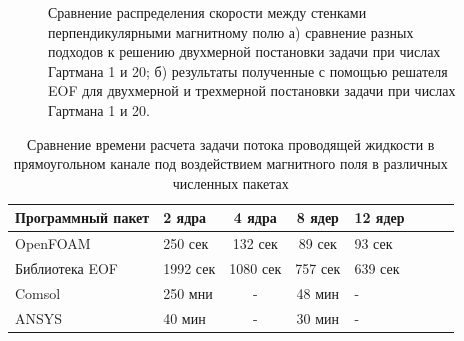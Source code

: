 \begin{figure}[t]
	\caption{Сравнение распределения скорости между стенками перпендикулярными магнитному полю а) сравнение разных подходов к решению двухмерной постановки задачи при числах Гартмана 1 и 20; б) результаты полученные с помощью решателя EOF для двухмерной и трехмерной постановки задачи при числах Гартмана 1 и 20.}
	\label{fig:comparision}
	
\end{figure}

\begin{table}[h!]
	\centering
	\captionsetup{justification=centering}
	\caption{Сравнение времени расчета задачи потока проводящей жидкости в прямоугольном канале под воздействием магнитного поля в различных численных пакетах}
	\begin{tabular}{llccllcc}
		\toprule	
			Программный пакет & 2 ядра        & 4 ядра       & 8  ядер    & 12   ядер  \\
			\midrule
			OpenFOAM                       & 250 сек  & 132 сек  & 89 сек  & 93 сек  \\ \hline
			Библиотека EOF                 & 1992 сек & 1080 сек & 757 сек & 639 сек \\ \hline
			Comsol                         & 250  мни & -        & 48 мин  & -       \\ \hline
			ANSYS                          & 40 мин   & -        & 30 мин  & -       \\ \hline
	\end{tabular}
\label{tab:comparision}
\end{table}



